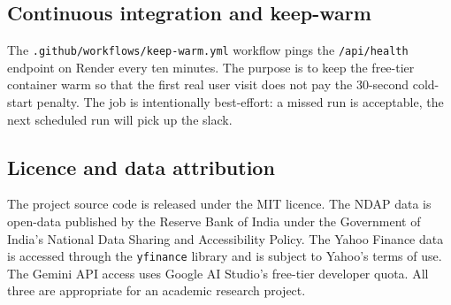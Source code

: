 \subsection{Continuous integration and keep-warm}

The \texttt{.github/workflows/keep-warm.yml} workflow pings the
\texttt{/api/health} endpoint on Render every ten minutes. The
purpose is to keep the free-tier container warm so that the first
real user visit does not pay the 30-second cold-start penalty. The
job is intentionally best-effort: a missed run is acceptable, the
next scheduled run will pick up the slack.

\subsection{Licence and data attribution}

The project source code is released under the MIT licence. The NDAP
data is open-data published by the Reserve Bank of India under the
Government of India's National Data Sharing and Accessibility
Policy. The Yahoo Finance data is accessed through the
\texttt{yfinance} library and is subject to Yahoo's terms of use.
The Gemini API access uses Google AI Studio's free-tier developer
quota. All three are appropriate for an academic research project.
